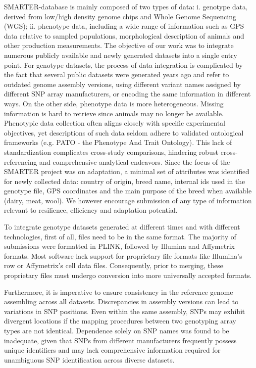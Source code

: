 \documentclass[a4paper,num-refs,gigabyte]{oup-contemporary}
\begin{document}
SMARTER-database is mainly composed of two types of data: i. genotype data, derived from low/high density genome chips and Whole Genome Sequencing (WGS); ii. phenotype data, including a wide range of information such as GPS data relative to sampled populations, morphological description of animals and other production measurements.
The objective of our work was to integrate numerous publicly available and newly generated datasets into a single entry point.
For genotype datasets, the process of data integration is complicated by the fact that several public datasets were generated years ago and refer to outdated genome assembly versions, using different variant names assigned by different SNP array manufacturers, or encoding the same information in different ways.
On the other side, phenotype data is more heterogeneous. Missing information is hard to retrieve since animals may no longer be available. Phenotypic data collection often aligns closely with specific experimental objectives, yet descriptions of such data seldom adhere to validated ontological frameworks (e.g. PATO - the Phenotype And Trait Ontology\citep{PATO}). This lack of standardization complicates cross-study comparisons, hindering robust cross-referencing and comprehensive analytical endeavors. Since the focus of the SMARTER project was on adaptation, a minimal set of attributes was identified for newly collected data: country of origin, breed name, internal ids used in the genotype file, GPS coordinates and the main purpose of the breed when available (dairy, meat, wool).  We however encourage submission of any type of information relevant to resilience, efficiency and adaptation potential.

To integrate genotype datasets generated at different times and with different technologies, first of all, files need to be in the same format. The majority of submissions were formatted in PLINK\citep{Purcell2007}, followed by Illumina and Affymetrix formats. Most software lack support for proprietary file formats like Illumina's row or Affymetrix's cell data files. Consequently, prior to merging, these proprietary files must undergo conversion into more universally accepted formats.

Furthermore, it is imperative to ensure consistency in the reference genome assembling across all datasets. Discrepancies in assembly versions can lead to variations in SNP positions. Even within the same assembly, SNPs may exhibit divergent locations if the mapping procedures between two genotyping array types are not identical\citep{Fadista2012,Gershoni2022}. Dependence solely on SNP names was found to be inadequate, given that SNPs from different manufacturers frequently possess unique identifiers and may lack comprehensive information required for unambiguous SNP identification across diverse datasets.
\end{document}
